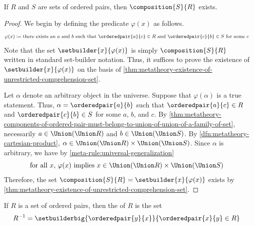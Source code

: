\begin{thm}
     \label{thm:metatheory-existence-of-composition-of-two-sets-of-ordered-pairs}
    If \( R \) and \( S \) are sets of ordered pairs, then \( \composition{S}{R} \) exists.
\end{thm}

\begin{proof}
    We begin by defining the predicate \( \varphi(x) \) as follows.
    \begin{equation*}
        \varphi(x) \coloneq \text{there exists an \( a \) and \( b \) such that \( \orderedpair{a}{c} \in R \) and \( \orderedpair{c}{b} \in S \) for some \( c \)}
    \end{equation*}
    Note that the set \( \setbuilder{x}{\varphi(x)} \) is simply \( \composition{S}{R} \) written in standard set-builder notation.
    Thus, it suffices to prove the existence of \( \setbuilder{x}{\varphi(x)} \) on the basis of \cref{thm:metatheory-existence-of-unrestricted-comprehension-set}.

    \vspace{0.3cm}
    \noindent
    Let \( \alpha \) denote an arbitrary object in the universe.
    Suppose that \( \varphi(\alpha) \) is a true statement.
    Thus, \( \alpha = \orderedpair{a}{b} \) such that
    \( \orderedpair{a}{c} \in R \) and \( \orderedpair{c}{b} \in S \) for some \( a \), \( b \), and \( c \).
    By \cref{thm:metatheory-components-of-ordered-pair-must-belong-to-union-of-union-of-a-family-of-set},
    necessarily \( a \in \Union \mleft( \Union R \mright) \) and \( b \in \Union \mleft( \Union S \mright) \).
    By \cref{dfn:metatheory-cartesian-product}, \( \alpha \in \Union \mleft( \Union R \mright) \times \Union \mleft( \Union S \mright) \).
    Since \( \alpha \) is arbitrary, we have by \cref{meta-rule:universal-generalization}
    \begin{equation*}
        \text{for all \( x \), \( \varphi(x) \) implies \( x \in \Union \mleft( \Union R \mright) \times \Union \mleft( \Union S \mright) \)}
    \end{equation*}
    Therefore, the set \( \composition{S}{R} = \setbuilder{x}{\varphi(x)} \) exists by \cref{thm:metatheory-existence-of-unrestricted-comprehension-set}.
\end{proof}

\begin{dfn}[Inverse]
     \label{dfn:metatheory-inverse-of-a-set-of-ordered-pairs}
    If \( R \) is a set of ordered pairs, then the  of \( R \) is the set
    \begin{equation*}
        R^{-1} = \setbuilderbig{\orderedpair{y}{x}}{\orderedpair{x}{y} \in R}
    \end{equation*}
\end{dfn}

